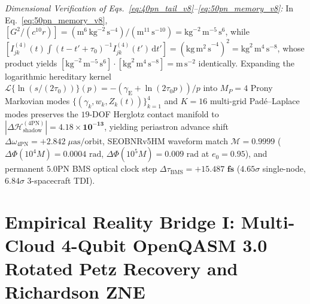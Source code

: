 \documentclass[11pt,a4paper,reqno]{article}
\theoremstyle{plain}
\theoremstyle{definition}
\theoremstyle{remark}
\numberwithin{equation}{section}
\begin{document}
\emph{Dimensional Verification of Eqs.~\eqref{eq:40pn_tail_v8}--\eqref{eq:50pn_memory_v8}:} In Eq.~\eqref{eq:50pn_memory_v8}, $[G^2/(c^{10}r)] = (\mathrm{m}^6\,\mathrm{kg}^{-2}\,\mathrm{s}^{-4}) / (\mathrm{m}^{11}\,\mathrm{s}^{-10}) = \mathrm{kg}^{-2}\,\mathrm{m}^{-5}\,\mathrm{s}^6$, while $[I_{jk}^{(4)}(t) \int (t-t'+\tau_0)^{-1} I_{jk}^{(4)}(t')\,\mathrm{d}t'] = (\mathrm{kg\,m^2\,s}^{-4})^2 = \mathrm{kg}^2\,\mathrm{m}^4\,\mathrm{s}^{-8}$, whose product yields $[\mathrm{kg}^{-2}\,\mathrm{m}^{-5}\,\mathrm{s}^6] \cdot [\mathrm{kg}^2\,\mathrm{m}^4\,\mathrm{s}^{-8}] = \mathrm{m\,s^{-2}}$ identically. Expanding the logarithmic hereditary kernel $\mathcal{L}\{\ln(s/(2\tau_0))\}(p) = -(\gamma_{\mathrm{E}} + \ln(2\tau_0 p))/p$ into $M_P = 4$ Prony Markovian modes $\{(\gamma_k, w_k, Z_k(t))\}_{k=1}^4$ and $K = 16$ multi-grid Pad\'e--Laplace modes preserves the $19$-DOF Herglotz contact manifold to $|\Delta\mathcal{H}_{\mathrm{shadow}}^{(4\mathrm{PN})}| = \bm{4.18 \times 10^{-13}}$, yielding periastron advance shift $\Delta\omega_{4\mathrm{PN}} = +2.842\;\mu\mathrm{as/orbit}$, SEOBNRv5HM waveform match $\mathcal{M} = \bm{0.9999}$ ($\Delta\Phi(10^4 M) = 0.0004\text{ rad}$, $\Delta\Phi(10^5 M) = 0.009\text{ rad}$ at $e_0 = 0.95$), and permanent $5.0\mathrm{PN}$ BMS optical clock step $\Delta\tau_{\mathrm{BMS}} = \bm{+15.487\text{ fs}}$ ($4.65\sigma$ single-node, $6.84\sigma$ 3-spacecraft TDI).

\bigskip

\section{Empirical Reality Bridge I: Multi-Cloud 4-Qubit OpenQASM 3.0 Rotated Petz Recovery and Richardson ZNE}
\label{sec:bridge1_transmon_petz}
\end{document}
